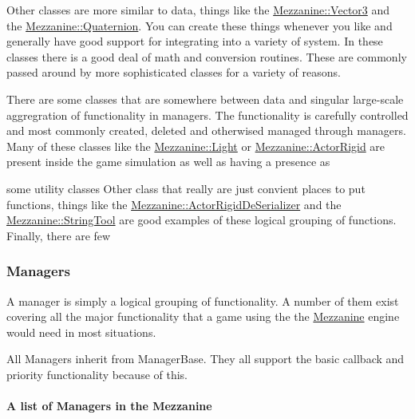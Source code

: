 Other classes are more similar to data, things like the \hyperlink{classMezzanine_1_1Vector3}{Mezzanine::Vector3} and the \hyperlink{classMezzanine_1_1Quaternion}{Mezzanine::Quaternion}. You can create these things whenever you like and generally have good support for integrating into a variety of system. In these classes there is a good deal of math and conversion routines. These are commonly passed around by more sophisticated classes for a variety of reasons.

There are some classes that are somewhere between data and singular large-\/scale aggregration of functionality in managers. The functionality is carefully controlled and most commonly created, deleted and otherwised managed through managers. Many of these classes like the \hyperlink{classMezzanine_1_1Light}{Mezzanine::Light} or \hyperlink{classMezzanine_1_1ActorRigid}{Mezzanine::ActorRigid} are present inside the game simulation as well as having a presence as

some utility classes Other class that really are just convient places to put functions, things like the \hyperlink{classMezzanine_1_1ActorRigidDeSerializer}{Mezzanine::ActorRigidDeSerializer} and the \hyperlink{classMezzanine_1_1StringTool}{Mezzanine::StringTool} are good examples of these logical grouping of functions. Finally, there are few\hypertarget{index_managers}{}\subsubsection{Managers}\label{index_managers}
A manager is simply a logical grouping of functionality. A number of them exist covering all the major functionality that a game using the the \hyperlink{namespaceMezzanine}{Mezzanine} engine would need in most situations.

All Managers inherit from ManagerBase. They all support the basic callback and priority functionality because of this.\hypertarget{index_managerlist}{}\paragraph{A list of Managers in the Mezzanine}\label{index_managerlist}

